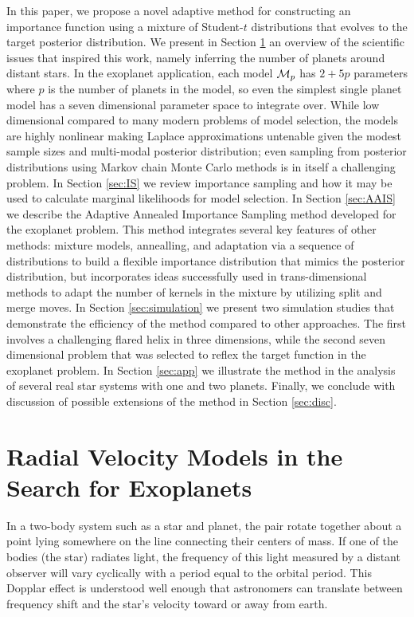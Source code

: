 \documentclass[aoas]{imsart}
\def\M{{\cal{M}}}
\begin{document}
In this paper, we propose a novel adaptive method for constructing an
importance function using a mixture of Student-$t$ distributions that
evolves to the target posterior distribution. We present in Section
\ref{sec:exo} an overview of the scientific issues that inspired this
work, namely inferring the number of planets around distant stars. In
the exoplanet application, each model $\M_p$ has $2+5p$ parameters
where $p$ is the number of planets in the model, so even the simplest
single planet model has a seven dimensional parameter space to
integrate over. While low dimensional compared to many modern problems
of model selection, the models are highly nonlinear making Laplace
approximations untenable given the modest sample sizes and multi-modal
posterior distribution; even sampling from posterior distributions
using Markov chain Monte Carlo methods is in itself a challenging
problem.  In Section \ref{sec:IS} we review importance sampling and
how it may be used to calculate marginal likelihoods for model
selection. In Section \ref{sec:AAIS} we describe the Adaptive Annealed
Importance Sampling method developed for the exoplanet problem. This
method integrates several key features of other methods: mixture
models, annealling, and adaptation via a sequence of distributions to
build a flexible importance distribution that mimics the posterior
distribution, but incorporates ideas successfully used in
trans-dimensional methods to adapt the number of kernels in the
mixture by utilizing split and merge moves.  In Section
\ref{sec:simulation} we present two simulation studies that
demonstrate the efficiency of the method compared to other approaches.
The first involves a challenging flared helix in three dimensions,
while the second seven dimensional problem that was selected to reflex
the target function in the exoplanet problem.  In Section
\ref{sec:app} we illustrate the method in the analysis of
several real star systems with one and two planets. Finally, we conclude with
discussion of possible extensions of the method in Section
\ref{sec:disc}.

\section{Radial Velocity Models in the Search for Exoplanets}
\label{sec:exo}

In a two-body system such as a star and planet, the pair rotate
together about a point lying somewhere on the line connecting their
centers of mass. If one of the bodies (the star) radiates light, the
frequency of this light measured by a distant observer will
 vary  cyclically with a period equal to the orbital period. This
Dopplar effect is understood well enough that astronomers can
translate between frequency shift and the star's velocity toward or
away from earth.  
\end{document}
